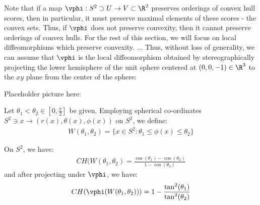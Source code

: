 Note that if a map $\vphi:S^2\supset U\to V\subset \R^2$ preserves 
orderings of convex hull scores, then in particular, it must preserve 
maximal elements of these scores - the convex sets. Thus, if 
$\vphi$ does not preserve convexity, then it cannot preserve orderings 
of convex hulls. For the rest of this section, we will focus on 
local diffeomorphisms which preserve convexity.
...
Thus, without loss of generality, we can assume that $\vphi$ 
is the local diffeomorphism obtained by stereographically  projecting the lower hemisphere of the unit sphere centered at $(0,0,-1)\in \R^3$ to 
the $xy$ plane from the center of the sphere:
\begin{center}
Placeholder picture here:
\end{center}
\begin{Definition}
Let $\theta_1<\theta_2\in \left[0, \frac{\pi}{2}\right]$ be given. Employing 
spherical co-ordinates $S^2\ni x\to (r(x),\theta(x),\phi(x))$ on $S^2$, we define:
\begin{align*}
W(\theta_1,\theta_2) 
= \{x\in S^2:\theta_1\le \phi(x)\le \theta_2\}
\end{align*}
\end{Definition}
\begin{Claim}
On $S^2$, we have:
\begin{align*}
CH(W(\theta_1,\theta_2) = \frac{\cos(\theta_1)-\cos(\theta_2)}{1-\cos(\theta_2)}
\end{align*}
and after projecting under $\vphi$, we have:
\begin{align*}
CH(\vphi(W(\theta_1,\theta_2))) 
  = 1-\frac{\tan^2(\theta_1)}{\tan^2(\theta_2)}
\end{align*}
\end{Claim}

